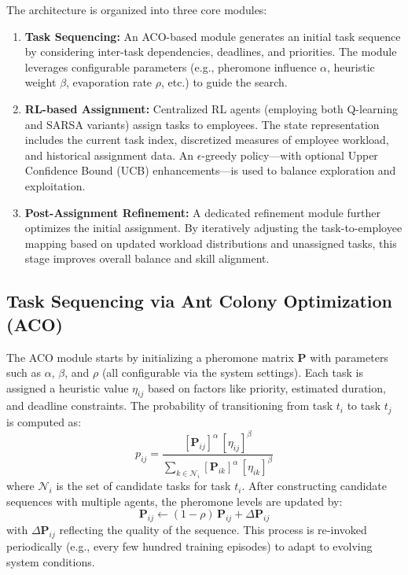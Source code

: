 \documentclass[%
aip,
cp,  %
reprint
]{revtex4-2}
\begin{document}
	The architecture is organized into three core modules:
	\begin{enumerate}
		\item \textbf{Task Sequencing:} An ACO-based module generates an initial task sequence by considering inter-task dependencies, deadlines, and priorities. The module leverages configurable parameters (e.g., pheromone influence $\alpha$, heuristic weight $\beta$, evaporation rate $\rho$, etc.) to guide the search.
		\item \textbf{RL-based Assignment:} Centralized RL agents (employing both Q-learning and SARSA variants) assign tasks to employees. The state representation includes the current task index, discretized measures of employee workload, and historical assignment data. An $\epsilon$-greedy policy—with optional Upper Confidence Bound (UCB) enhancements—is used to balance exploration and exploitation.
		\item \textbf{Post-Assignment Refinement:} A dedicated refinement module further optimizes the initial assignment. By iteratively adjusting the task-to-employee mapping based on updated workload distributions and unassigned tasks, this stage improves overall balance and skill alignment.
	\end{enumerate}
	
	\subsection{\label{subsec:task-seq}Task Sequencing via Ant Colony Optimization (ACO)}
	
	The ACO module starts by initializing a pheromone matrix $\mathbf{P}$ with parameters such as $\alpha$, $\beta$, and $\rho$ (all configurable via the system settings). Each task is assigned a heuristic value $\eta_{ij}$ based on factors like priority, estimated duration, and deadline constraints. The probability of transitioning from task $t_i$ to task $t_j$ is computed as:
	\begin{equation}
		p_{ij} = \frac{[\mathbf{P}_{ij}]^{\alpha} \,[\eta_{ij}]^{\beta}}{\sum_{k \in \mathcal{N}_i}[\mathbf{P}_{ik}]^{\alpha} \,[\eta_{ik}]^{\beta}}
	\end{equation}
	where $\mathcal{N}_i$ is the set of candidate tasks for task $t_i$. After constructing candidate sequences with multiple agents, the pheromone levels are updated by:
	\begin{equation}
		\mathbf{P}_{ij} \leftarrow (1 - \rho)\,\mathbf{P}_{ij} + \Delta \mathbf{P}_{ij}
	\end{equation}
	with $\Delta \mathbf{P}_{ij}$ reflecting the quality of the sequence. This process is re-invoked periodically (e.g., every few hundred training episodes) to adapt to evolving system conditions.
	
\end{document}
